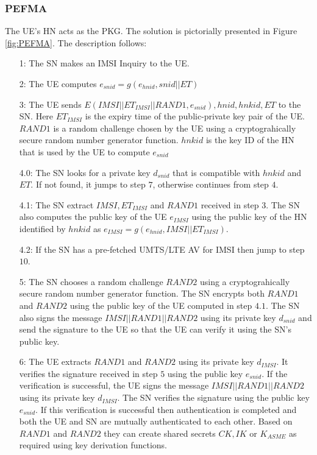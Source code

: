 \documentclass{river-journal}
\begin{document}
\subsubsection{PEFMA}
The UE's HN acts as the PKG. The solution is pictorially presented in Figure \ref{fig:PEFMA}. The description follows:

\begin{itemize}
\item[1:] The SN makes an IMSI Inquiry to the UE. 
\item[2:] The UE computes $e_{snid} = g\left(e_{hnid},snid||ET \right)$
\item[3:] The UE sends $E(IMSI||ET_{IMSI}||RAND1,e_{snid}),hnid,hnkid,ET$ to the SN. Here $ET_{IMSI}$ is the expiry time of the public-private key pair of the UE. $RAND1$ is a random challenge chosen by the UE using a cryptograhically secure random number generator function. $hnkid$ is the key ID of the HN that is used by the UE to compute $e_{snid}$
\item[4.0:] The SN looks for a private key $d_{snid}$ that is compatible with $hnkid$ and $ET$. If not found, it jumps to step $7$, otherwise continues from step $4$.
\item[4.1:] The SN extract $IMSI,ET_{IMSI}$ and $RAND1$ received in step $3$. The SN also computes the public key of the UE $e_{IMSI}$ using the public key of the HN identified by $hnkid$ as $e_{IMSI} = g(e_{hnid},IMSI||ET_{IMSI})$.
\item[4.2:] If the SN has a pre-fetched UMTS/LTE AV for IMSI then jump to step $10$.
\item[5:] The SN chooses a random challenge $RAND2$ using a cryptograhically secure random number generator function. The SN encrypts both $RAND1$ and $RAND2$ using the public key of the UE computed in step $4.1$. The SN also signs the message $IMSI||RAND1||RAND2$ using its private key $d_{snid}$ and send the signature to the UE so that the UE can verify it using the SN's public key. 
\item[6:] The UE extracts $RAND1$ and $RAND2$ using its private key $d_{IMSI}$. It verifies the signature received in step $5$ using the public key $e_{snid}$. If the verification is successful, the UE signs the message $IMSI||RAND1||RAND2$ using its private key $d_{IMSI}$. The SN verifies the signature using the public key $e_{snid}$. If this verification is successful then authentication is completed and both the UE and SN are mutually authenticated to each other. Based on $RAND1$ and $RAND2$ they can create shared secrets $CK,IK$ or $K_{ASME}$ as required using key derivation functions.


\end{itemize}
\end{document}
